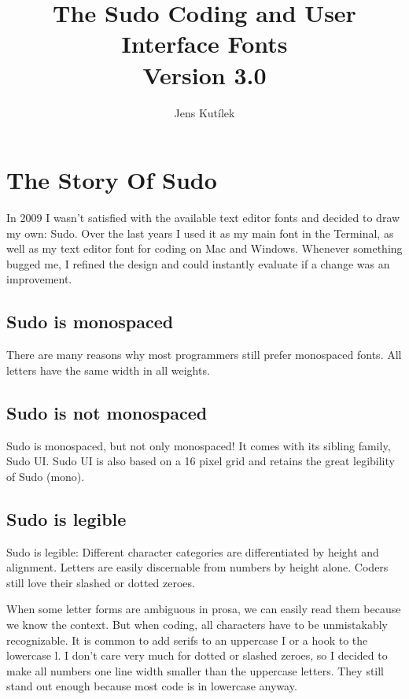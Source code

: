 \documentclass[paper=a4, 12pt]{scrbook}
\title{The Sudo Coding and User Interface Fonts\\ Version 3.0}
\author{Jens Kutílek}
\begin{document}
\maketitle

\tableofcontents

\chapter{The Story Of Sudo}

In 2009 I wasn’t satisfied with the available text editor fonts and decided to draw my own: Sudo. Over the last years I used it as my main font in the Terminal, as well as my text editor font for coding on Mac and Windows. Whenever something bugged me, I refined the design and could instantly evaluate if a change was an improvement.

\section{Sudo is mono­spaced}

There are many reasons why most programmers still prefer monospaced fonts. All letters have the same width in all weights.

\section{Sudo is not mono­spaced}
Sudo is monospaced, but not only monospaced! It comes with its sibling family, Sudo UI. Sudo UI is also based on a 16 pixel grid and retains the great legibility of Sudo (mono).

\section{Sudo is legible}
Sudo is legible: Different character categories are differentiated by height and alignment. Letters are easily discernable from numbers by height alone. Coders still love their slashed or dotted zeroes.

When some letter forms are ambiguous in prosa, we can easily read them because we know the context. But when coding, all characters have to be unmistakably recognizable. It is common to add serifs to an uppercase I or a hook to the lowercase l. I don’t care very much for dotted or slashed zeroes, so I decided to make all numbers one line width smaller than the uppercase letters. They still stand out enough because most code is in lowercase anyway.
\end{document}
